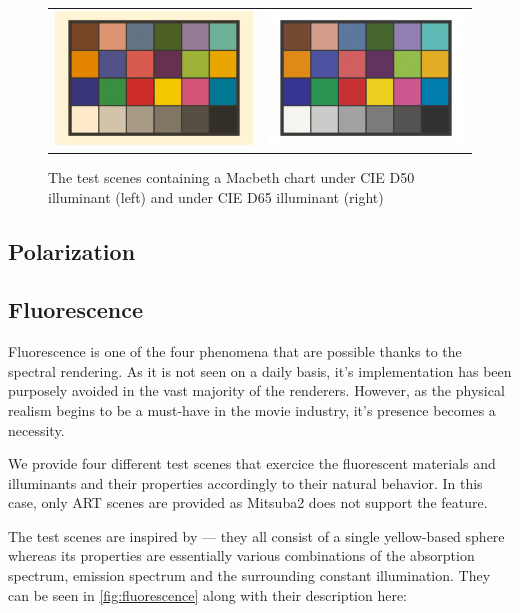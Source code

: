 \begin{figure}[h]
	\begin{tabular}{cc}
		\includegraphics[width=.45\linewidth]{img/macbeth_chart_D50.png}
		&
		\includegraphics[width=.45\linewidth]{img/macbeth_chart_D65.png}
	\end{tabular}
	\caption{The test scenes containing a Macbeth chart under CIE D50 illuminant (left) and under CIE D65 illuminant (right)}
	\label{fig:macbeth}
\end{figure}

\subsection{Polarization}

\subsection{Fluorescence}

Fluorescence is one of the four phenomena that are possible thanks to the spectral rendering. As it is not seen on a daily basis, it's implementation has been purposely avoided in the vast majority of the renderers. However, as the physical realism begins to be a must-have in the movie industry, it's presence becomes a necessity.

We provide four different test scenes that exercice the fluorescent materials and illuminants and their properties accordingly to their natural behavior. In this case, only ART scenes are provided as Mitsuba2 does not support the feature. 

The test scenes are inspired by \citet{mojzik2018handling} --- they all consist of a single yellow-based sphere whereas its properties are essentially various combinations of the absorption spectrum, emission spectrum and the surrounding constant illumination. They can be seen in \autoref{fig:fluorescence} along with their description here:

